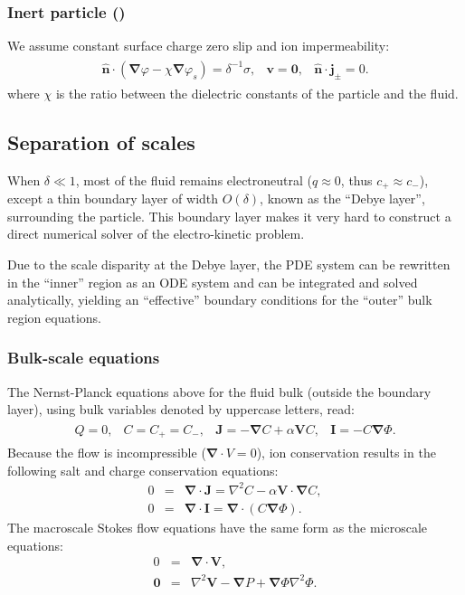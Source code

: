 \documentclass[10pt]{ijnam}
\newcommand{\pars}[1]{\left(#1\right)}
\newcommand\Laplacian{\nabla^2}
\newcommand\bnabla{\boldsymbol{\nabla}}
\newcommand\bv{\boldsymbol{v}}
\newcommand\bV{\boldsymbol{V}}
\newcommand\bn{\boldsymbol{\hat{n}}}
\newcommand\bj{\boldsymbol{j}}
\newcommand\bI{\boldsymbol{I}}
\newcommand\bJ{\boldsymbol{J}}
\newcommand\bzero{\boldsymbol{0}}
\begin{document}
\subsubsection{Inert particle (\cite{schnitzer2012surface})}
We assume constant surface charge
zero slip and ion impermeability:
\begin{eqnarray*}
\begin{array}{cccc}
\bn \cdot (\bnabla \varphi - \chi \bnabla \varphi_s) = \delta^{-1} \sigma, &
\bv = \bzero, &
\bn \cdot \bj_\pm = 0.
\end{array}
\end{eqnarray*}
where $\chi$ is the ratio between the dielectric constants of the 
particle and the fluid.

\subsection{Separation of scales}
When $\delta \ll 1$, 
most of the fluid remains electroneutral ($q \approx 0$, thus $c_+ \approx c_-$), 
except a thin boundary layer of width $O(\delta)$, 
known as the ``Debye layer'', surrounding the particle.
This boundary layer makes it very hard to construct 
a direct numerical solver of the electro-kinetic problem.

Due to the scale disparity at the Debye layer, 
the PDE system can be rewritten in the ``inner'' region 
as an ODE system and can be integrated and solved analytically,
yielding an ``effective'' boundary conditions for the ``outer'' bulk region equations.

\subsubsection  {Bulk-scale equations}
The Nernst-Planck equations above for the fluid bulk (outside
the boundary layer), using bulk variables denoted by uppercase letters, read:
\begin{eqnarray*}
\begin{array}{cccc}
  Q = 0, &
  C = C_+ = C_-, &
\bJ = -\bnabla C + \alpha \bV C, &
\bI = -C \bnabla \varPhi.
\end{array}\end{eqnarray*}
Because the flow is incompressible ($\bnabla \cdot V = 0$), 
ion conservation results in the following 
salt and charge conservation equations:
\begin{eqnarray*} 
0 &=& \bnabla \cdot \bJ = \Laplacian C - \alpha \bV \cdot \bnabla C, \\
0 &=& \bnabla \cdot \bI = \bnabla \cdot \pars{ C \bnabla \varPhi }.
\end{eqnarray*}
The macroscale Stokes flow equations have the same form as the microscale equations:
\begin{eqnarray*} 
0 &=& \bnabla \cdot \bV, \\   
\bzero &=& \Laplacian \bV - \bnabla P + \bnabla \varPhi \Laplacian \varPhi.
\end{eqnarray*}
\end{document}
